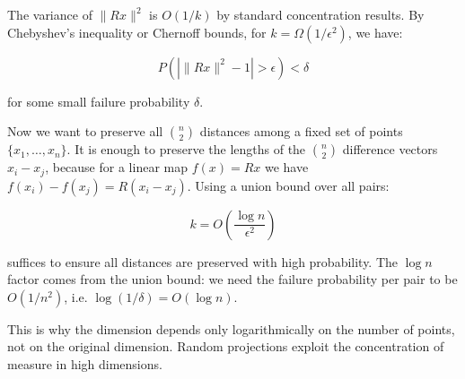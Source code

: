 \vspace{1em}

The variance of $\|Rx\|^2$ is $O(1/k)$ by standard concentration results. By Chebyshev's inequality or Chernoff bounds, for $k = \Omega(1/\epsilon^2)$, we have:

\begin{equation}
P(|\|Rx\|^2 - 1| > \epsilon) < \delta
\end{equation}

for some small failure probability $\delta$.

\vspace{1em}

Now we want to preserve all $\binom{n}{2}$ distances among a fixed set of points $\{x_1,\ldots,x_n\}$. It is enough to preserve the lengths of the $\binom{n}{2}$ difference vectors $x_i-x_j$, because for a linear map $f(x)=Rx$ we have $f(x_i)-f(x_j)=R(x_i-x_j)$. Using a union bound over all pairs:

\begin{equation}
k = O\left(\frac{\log n}{\epsilon^2}\right)
\end{equation}

suffices to ensure all distances are preserved with high probability. The $\log n$ factor comes from the union bound: we need the failure probability per pair to be $O(1/n^2)$, i.e. $\log(1/\delta) = O(\log n)$.

\vspace{1em}

This is why the dimension depends only logarithmically on the number of points, not on the original dimension. Random projections exploit the concentration of measure in high dimensions.

\vspace{1.5em}

